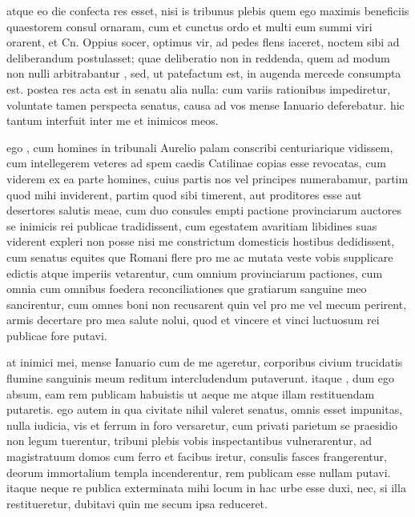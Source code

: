 atque eo die confecta res esset, nisi is tribunus plebis quem ego maximis beneficiis quaestorem consul ornaram, cum et cunctus ordo et multi eum summi viri orarent, et Cn. Oppius socer, optimus vir, ad pedes flens iaceret, noctem sibi ad deliberandum postulasset; quae deliberatio non in reddenda, quem ad modum non nulli arbitrabantur , sed, ut patefactum est, in augenda mercede consumpta est. postea res acta est in senatu alia nulla: cum variis rationibus impediretur, voluntate tamen perspecta senatus, causa ad vos mense Ianuario deferebatur. hic tantum interfuit inter me et inimicos meos.

 ego , cum homines in tribunali Aurelio palam conscribi centuriarique vidissem, cum intellegerem veteres ad spem caedis Catilinae copias esse revocatas, cum viderem ex ea parte homines, cuius partis nos vel principes numerabamur, partim quod mihi inviderent, partim quod sibi timerent, aut proditores esse aut desertores salutis meae, cum duo consules empti pactione provinciarum auctores se inimicis rei publicae tradidissent, cum egestatem avaritiam libidines suas viderent expleri non posse nisi me constrictum domesticis hostibus dedidissent, cum senatus equites que Romani flere pro me ac mutata veste vobis supplicare edictis atque imperiis vetarentur, cum omnium provinciarum pactiones, cum omnia cum omnibus foedera reconciliationes que gratiarum sanguine meo sancirentur, cum omnes boni non recusarent quin vel pro me vel mecum perirent, armis decertare pro mea salute nolui, quod et vincere et vinci luctuosum rei publicae fore putavi.

 at inimici mei, mense Ianuario cum de me ageretur, corporibus civium trucidatis flumine sanguinis meum reditum intercludendum putaverunt. itaque , dum ego absum, eam rem publicam habuistis ut aeque me atque illam restituendam putaretis. ego autem in qua civitate nihil valeret senatus, omnis esset impunitas, nulla iudicia, vis et ferrum in foro versaretur, cum privati parietum se praesidio non legum tuerentur, tribuni plebis vobis inspectantibus vulnerarentur, ad magistratuum domos cum ferro et facibus iretur, consulis fasces frangerentur, deorum immortalium templa incenderentur, rem publicam esse nullam putavi. itaque neque re publica exterminata mihi locum in hac urbe esse duxi, nec, si illa restitueretur, dubitavi quin me secum ipsa reduceret.

